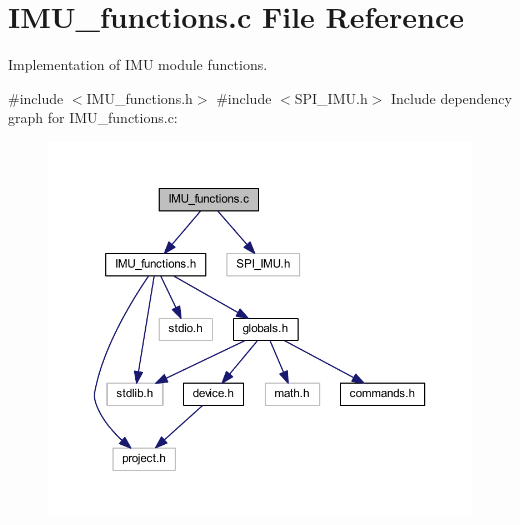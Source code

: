 \section{I\+M\+U\+\_\+functions.\+c File Reference}
\label{_i_m_u__functions_8c}


Implementation of I\+MU module functions.  


{\ttfamily \#include $<$I\+M\+U\+\_\+functions.\+h$>$}\newline
{\ttfamily \#include $<$S\+P\+I\+\_\+\+I\+M\+U.\+h$>$}\newline
Include dependency graph for I\+M\+U\+\_\+functions.\+c\+:
\nopagebreak
\begin{figure}[H]
\begin{center}
\leavevmode
\includegraphics[width=350pt]{_i_m_u__functions_8c__incl}
\end{center}
\end{figure}
